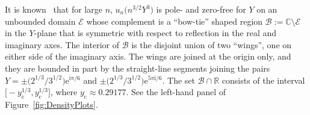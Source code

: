 \documentclass[11pt]{article}
\numberwithin{equation}{section}
\numberwithin{equation}{section}
\begin{document}
It is known~\cite[Theorem 3]{BuckinghamM22} that for large $n$, $u_n\bigl(n^{3/2}Y^3\bigr)$ is pole- and zero-free for $Y$ on an unbounded domain $\mathcal{E}$ whose complement is a ``bow-tie'' shaped region $\mathcal{B}:=\mathbb{C}\setminus\mathcal{E}$ in the $Y$-plane that is symmetric with respect to reflection in the real and imaginary axes. The interior of $\mathcal{B}$ is the disjoint union of two ``wings'', one on either side of the imaginary axis. The wings are joined at the origin only, and they are bounded in part by the straight-line segments joining the pairs $Y=\pm \bigl(2^{1/3}/3^{1/2}\bigr)\mathrm{e}^{\mathrm{i}\pi/6}$ and $\pm \bigl(2^{1/3}/3^{1/2}\bigr)\mathrm{e}^{5\pi\mathrm{i}/6}$. The set $\mathcal{B}\cap\mathbb{R}$ consists of the interval $\bigl[-y_\mathrm{c}^{1/3},y_\mathrm{c}^{1/3}\bigr]$, where $y_\mathrm{c}\approx 0.29177$. See the left-hand panel of Figure~\ref{fig:DensityPlots}.
\end{document}
